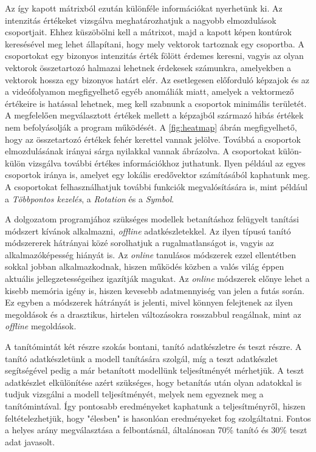 Az így kapott mátrixból ezután különféle információkat nyerhetünk ki. Az intenzitás értékeket vizsgálva meghatározhatjuk a nagyobb elmozdulások csoportjait. Ehhez küszöbölni kell a mátrixot, majd a kapott képen kontúrok keresésével meg lehet állapítani, hogy mely vektorok tartoznak egy csoportba. A csoportokat egy bizonyos intenzitás érték fölött érdemes keresni, vagyis az olyan vektorok összetartozó halmazai lehetnek érdekesek számunkra, amelyekben a vektorok hossza egy bizonyos határt elér. Az esetlegesen előforduló képzajok és az a videófolyamon megfigyelhető egyéb anomáliák miatt, amelyek a vektormező értékeire is hatással lehetnek, meg kell szabnunk a csoportok minimális területét. A megfelelően megválasztott értékek mellett a képzajból származó hibás értékek nem befolyásolják a program működését.
A \ref{fig:heatmap} ábrán megfigyelhető, hogy az összetartozó értékek fehér kerettel vannak jelölve. Továbbá a csoportok elmozdulásának irányai sárga nyilakkal vannak ábrázolva. A csoportokat külön-külön vizsgálva további értékes információkhoz juthatunk. Ilyen például az egyes csoportok iránya is, amelyet egy lokális eredővektor számításából kaphatunk meg. A csoportokat felhasználhatjuk további funkciók megvalósítására is, mint például a \textit{Többpontos kezelés}, a \textit{Rotation} és a \textit{Symbol}.


A dolgozatom programjához szükséges modellek betanításhoz felügyelt tanítási módszert kívánok alkalmazni, \textit{offline} adatkészletekkel. Az ilyen típusú tanító módszererek hátrányai közé sorolhatjuk a rugalmatlanságot is, vagyis az alkalmazóképesség hiányát is. Az \textit{online} tanulásos módszerek ezzel ellentétben sokkal jobban alkalmazkodnak, hiszen működés közben a valós világ éppen aktuális jellegzetességeihez igazítják magukat. Az \textit{online} módszerek előnye lehet a kisebb memória igény is, hiszen kevesebb adatmennyiség van jelen a futás során. Ez egyben a módszerek hátrányát is jelenti, mivel könnyen felejtenek az ilyen megoldások és a drasztikus, hirtelen változásokra rosszabbul reagálnak, mint az \textit{offline} megoldások. \cite{geron2019hands}

A tanítómintát két részre szokás bontani, tanító adatkészletre és teszt részre. A tanító adatkészletünk a modell tanítására szolgál, míg a teszt adatkészlet segítségével pedig a már betanított modellünk teljesítményét mérhetjük. A teszt adatkészlet elkülönítése azért szükséges, hogy betanítás után olyan adatokkal is tudjuk vizsgálni a modell teljesítményét, melyek nem egyeznek meg a tanítómintával. Így pontosabb eredményeket kaphatunk a teljesítményről, hiszen feltételezhetjük, hogy "élesben" is hasonlóan eredményeket fog szolgáltatni. Fontos a helyes arány megválasztása a felbontásnál, általánosan 70\% tanító és 30\% teszt adat javasolt. \cite{geron2019hands}

